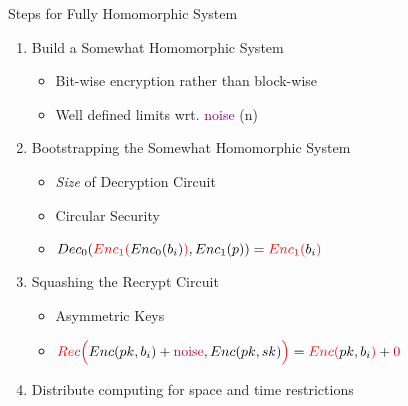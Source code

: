 \documentclass[dvips,11pt]{beamer}
\begin{document}
\begin{frame}{Steps for Fully Homomorphic System}
  \begin{enumerate}
    \item Build a Somewhat Homomorphic System
      \begin{itemize}
        \item Bit-wise encryption rather than block-wise
        \item Well defined limits wrt. \textcolor{purple}{noise} (n)
      \end{itemize}
    \item Bootstrapping the Somewhat Homomorphic System
      \begin{itemize}
        \item {\em Size} of Decryption Circuit
        \item Circular Security
        \item \(
          Dec_0(\textcolor{red}{Enc_1(}Enc_0(b_i)
          \textcolor{red}{)},
          Enc_1(p)
          ) 
          =\textcolor{red}{Enc_1(}b_i\textcolor{red}{)}\)
      \end{itemize}
    \item Squashing the Recrypt Circuit
      \begin{itemize}
        \item Asymmetric Keys 
        \item \(
          \textcolor{red}{Rec\Big(}Enc(pk,b_i)
          +\textcolor{purple}{\text{noise}},Enc(pk,sk)\textcolor{red}{\Big)} 
          =\textcolor{red}{Enc(}pk,b_i\textcolor{red}{)}
          +\textcolor{purple}{\text{0}}\)
      \end{itemize}
    \item Distribute computing for space and time restrictions
  \end{enumerate}
\end{frame}

\begin{comment}
\begin{frame}{ Ideals of the Integer Ring }

i want to find my book 

\end{frame}
\end{comment}
\end{document}
